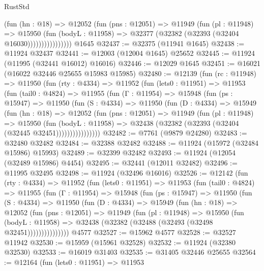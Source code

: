 \begin{lexlean}{RustStd}
\begin{coremodule}
                      (fun (hn : @18) =>
                      @12052
                        (fun (pns : @12051) =>
                        @11949
                          (fun (pl : @11948) =>
                          @15950
                            (fun (bodyL : @11958) =>
                            @32377 (@32382 (@32393 (@32404 @16030))))))))))))))))
    @1645
@32437 := @32375 (@11941 @1645)
@32438 := @11924 @32437
@32441 := @12003 (@12004 @1645) @25652
@32445 := @11924 (@11995 (@32441 @16012) @16016)
@32446 := @12029 @1645
@32451 := @16021 (@16022 @32446 @25655 @15983 @15985)
@32480 := @12139
    (fun (rc : @11948) =>
    @11950
      (fun (rty : @4334) =>
      @11952
        (fun (lets0 : @11951) =>
        @11953
          (fun (tail0 : @4824) =>
          @11955
            (fun (Γ : @11954) =>
            @15948
              (fun (ps : @15947) =>
              @11950
                (fun (S : @4334) =>
                @11950
                  (fun (D : @4334) =>
                  @15949
                    (fun (hn : @18) =>
                    @12052
                      (fun (pns : @12051) =>
                      @11949
                        (fun (pl : @11948) =>
                        @15950
                          (fun (bodyL : @11958) =>
                          @32438 (@32382 (@32393 (@32404 (@32445 @32451))))))))))))))))
@32482 := @7761 (@9879 @24280)
@32483 := @32480 @32482
@32484 := @32388 @32482
@32488 := @11924 (@15972 (@32484 @15986) @15993)
@32489 := @32399 @32482
@32493 := @11924 (@12054 (@32489 @15986) @4454)
@32495 := @32441 (@12011 @32482)
@32496 := @11995 @32495
@32498 := @11924 (@32496 @16016)
@32526 := @12142
    (fun (rty : @4334) =>
    @11952
      (fun (lets0 : @11951) =>
      @11953
        (fun (tail0 : @4824) =>
        @11955
          (fun (Γ : @11954) =>
          @15948
            (fun (ps : @15947) =>
            @11950
              (fun (S : @4334) =>
              @11950
                (fun (D : @4334) =>
                @15949
                  (fun (hn : @18) =>
                  @12052
                    (fun (pns : @12051) =>
                    @11949
                      (fun (pl : @11948) =>
                      @15950
                        (fun (bodyL : @11958) =>
                        @32438 (@32382 (@32488 (@32493 (@32498 @32451)))))))))))))))
    @4577
@32527 := @15962 @4577
@32528 := @32527 @11942
@32530 := @15959 (@15961 @32528)
@32532 := @11924 (@32380 @32530)
@32533 := @16019 @31403
@32535 := @31405 @32446 @25655
@32564 := @12164
    (fun (lets0 : @11951) =>
    @11953

\end{coremodule}
\end{lexlean}
